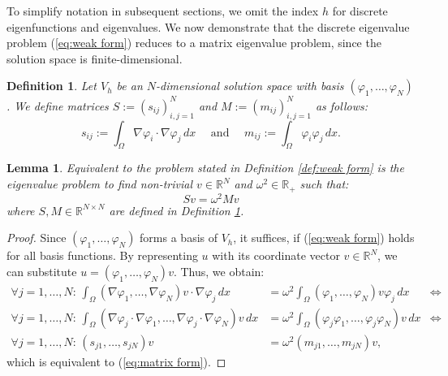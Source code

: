 \documentclass[a4paper,11pt,bibliography=totoc,listof=totoc,headinclude=true,cleardoublepage=empty,oneside]{scrbook}
\newtheorem{definition}[theorem]{Definition}
\newtheorem{lemma}[theorem]{Lemma}
\newcommand{\R}{\mathbb{R}}
\renewcommand{\eqref}[1]{(\ref{#1})}
\begin{document}
To simplify notation in subsequent sections, we omit the index $h$ for discrete eigenfunctions and eigenvalues. We now demonstrate that the discrete eigenvalue problem \eqref{eq:weak form} reduces to a matrix eigenvalue problem, since the solution space is finite-dimensional.

\begin{definition}\label{def:SM matrices}
Let $V_h$ be an $N$-dimensional solution space with basis $(\varphi_1, \dots, \varphi_N)$. We define matrices $S:=(s_{ij})_{i, j=1}^N $ and $M:=(m_{ij})_{i, j=1}^N $ as follows:
\begin{equation*}
s_{ij} := \int_\Omega \nabla \varphi_i \cdot \nabla \varphi_j \, dx \quad \text{ and } \quad m_{ij} := \int_\Omega \varphi_i \varphi_j \, dx.
\end{equation*}
\end{definition}

\begin{lemma}
Equivalent to the problem stated in Definition \ref{def:weak form} is the eigenvalue problem to find non-trivial $v \in \R^N$ and $\omega^2 \in \R_+$ such that:
\begin{equation}\label{eq:matrix form}
Sv = \omega^2 Mv
\end{equation}
where $S, M \in \R^{N \times N}$ are defined in Definition \ref{def:SM matrices}.
\end{lemma}

\begin{proof}
Since $(\varphi_1, \dots, \varphi_N)$ forms a basis of $V_h$, it suffices, if \eqref{eq:weak form} holds for all basis functions. By representing $u$ with its coordinate vector $v\in \R^N$, we can substitute $u = (\varphi_1, \dots, \varphi_N) v$. Thus, we obtain:
\begin{align*}
        \forall j=1, \dots, N : \, \int_\Omega (\nabla\varphi_1, \dots, \nabla\varphi_N)v\cdot \nabla \varphi_j \, dx &= \omega^2 \int_\Omega (\varphi_1, \dots, \varphi_N)v \varphi_j \, dx & \iff \\
        \forall j=1, \dots, N : \, \int_\Omega (\nabla \varphi_j \cdot \nabla \varphi_1, \dots, \nabla \varphi_j \cdot \nabla \varphi_N) v \, dx &= \omega^2 \int_\Omega (\varphi_j\varphi_1, \dots, \varphi_j\varphi_N)v \,dx & \iff \\ 
        \forall j = 1, \dots, N: \, (s_{j1},\dots,s_{jN})v &= \omega^2 (m_{j1},\dots, m_{jN})v, &
\end{align*}
which is equivalent to \eqref{eq:matrix form}.
\end{proof}
\end{document}
